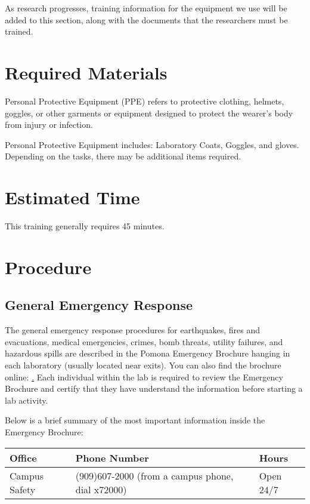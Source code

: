 \documentclass[12pt]{../SOP4_alpha}\usepackage[]{graphicx}\usepackage[]{color}
\begin{document}
\NP As research progresses, training information for the equipment we use will be added to this section, along with the documents that the researchers must be trained.

\section{Required Materials}

\NP Personal Protective Equipment (PPE) refers to protective clothing, helmets, goggles, or other garments or equipment designed to protect the wearer's body from injury or infection. 

\NP Personal Protective Equipment includes: Laboratory Coats, Goggles, and gloves. Depending on the tasks, there may be additional items required.

\section{Estimated Time}

\NP This training generally requires 45 minutes.

\section{Procedure}

\subsection*{General Emergency Response}

\NP The general emergency response procedures for earthquakes, fires and evacuations, medical emergencies, crimes, bomb threats, utility failures, and hazardous spills are described in the Pomona Emergency Brochure hanging in each laboratory (usually located near exits). You can also find the brochure online: \href{http://www.pomona.edu/sites/default/files/emergency-instructions.pdf}. Each individual within the lab is required to review the Emergency Brochure and certify that they have understand the information before starting a lab activity.

\NP Below is a brief summary of the most important information inside the Emergency Brochure: 

\begin{table}
\begin{tabular}{lll} \hline
Office            & Phone Number & Hours \\ \hline\hline
Campus Safety     & (909)607-2000 (from a campus phone, dial x72000) & Open 24/7 \\ \hline
\end{tabular}
\end{table}
\end{document}
